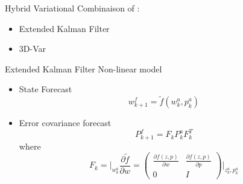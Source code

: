 \documentclass{beamer}
\begin{document}
\begin{frame}{Hybrid Variational}
    Combinaison of :
    \begin{itemize}
        \item  Extended Kalman Filter 
        \item  3D-Var
    \end{itemize}
\end{frame}
\begin{frame}{Extended Kalman Filter}
Non-linear model
    \begin{itemize}
        \item State Forecast 
        \begin{equation}
            w_{k+1}^f = \tilde{f} (w_k^a, p_k^a)
            \label{EKFfor}
            \end{equation}
        \item  Error covariance forecast
        \begin{equation}
        P_{k+1}^f = F_k P_k^a F_k^T
        \label{CovEKF}
        \end{equation}
    where 
            \begin{equation}
            F_k = \big|_{w_k^a} \frac{\partial \tilde{f} }{ \partial w } = 
            \begin{pmatrix}
            \frac{\partial f(z,p)}{\partial w } & \frac{\partial f(z,p)}{ \partial p}\\
            0 & I 
            \end{pmatrix}  \big|_{{z_k^a},{ p_k^a}}
            \label{EKFF}
            \end{equation}
    \end{itemize}
\end{frame}
\end{document}
